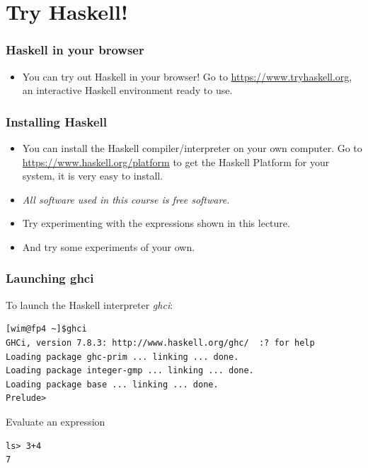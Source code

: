 \documentclass{beamer}
\begin{document}
\section{Try Haskell!}




\begin{frame}
\frametitle{Haskell in your browser}

\begin{itemize}
\item You can try out Haskell in your browser! Go to \url{https://www.tryhaskell.org}, an interactive Haskell environment ready to use.
\end{itemize}

\end{frame}

\begin{frame}
\frametitle{Installing Haskell}

\begin{itemize}
\item  You can install the Haskell compiler/interpreter on your own computer. Go to \url{https://www.haskell.org/platform} to get the Haskell Platform for your system, it is very easy to install.

\item \emph{All software used in this course is free software.}
\item Try experimenting with the expressions shown in this lecture.
\item And try some experiments of your own.
\end{itemize}


\end{frame}


\begin{frame}[fragile]
\frametitle{Launching ghci}

To launch the  Haskell interpreter \emph{ghci}:
{\footnotesize
\begin{verbatim}
[wim@fp4 ~]$ghci
GHCi, version 7.8.3: http://www.haskell.org/ghc/  :? for help
Loading package ghc-prim ... linking ... done.
Loading package integer-gmp ... linking ... done.
Loading package base ... linking ... done.
Prelude> 
\end{verbatim}
}

Evaluate an expression

\begin{verbatim}
ls> 3+4
7
\end{verbatim}

\end{frame}
\end{document}
